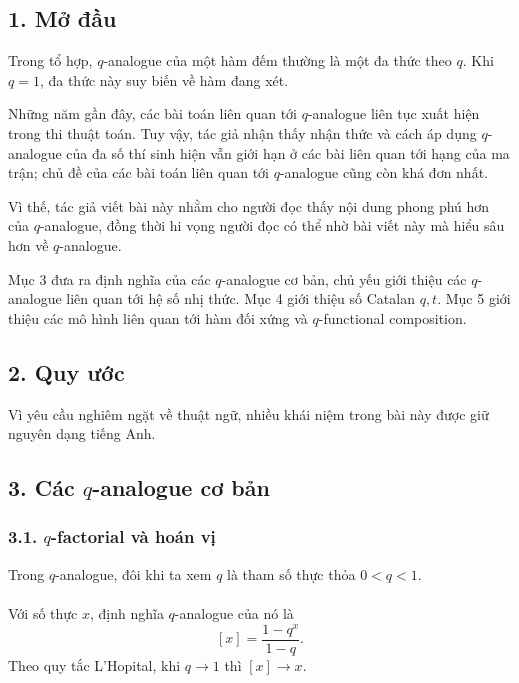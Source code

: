 \documentclass[11pt]{article}
\begin{document}
\subsection*{1. Mở đầu}

Trong tổ hợp, \(q\)-analogue của một hàm đếm thường là một đa thức theo \(q\).
Khi \(q=1\), đa thức này suy biến về hàm đang xét.

Những năm gần đây, các bài toán liên quan tới \(q\)-analogue liên tục xuất
hiện trong thi thuật toán. Tuy vậy, tác giả nhận thấy nhận thức và cách áp
dụng \(q\)-analogue của đa số thí sinh hiện vẫn giới hạn ở các bài liên quan
tới hạng của ma trận; chủ đề của các bài toán liên quan tới \(q\)-analogue
cũng còn khá đơn nhất.

Vì thế, tác giả viết bài này nhằm cho người đọc thấy nội dung phong phú hơn
của \(q\)-analogue, đồng thời hi vọng người đọc có thể nhờ bài viết này mà
hiểu sâu hơn về \(q\)-analogue.

Mục 3 đưa ra định nghĩa của các \(q\)-analogue cơ bản, chủ yếu giới thiệu các
\(q\)-analogue liên quan tới hệ số nhị thức. Mục 4 giới thiệu số Catalan
\(q,t\). Mục 5 giới thiệu các mô hình liên quan tới hàm đối xứng và
\(q\)-functional composition.

\subsection*{2. Quy ước}

Vì yêu cầu nghiêm ngặt về thuật ngữ, nhiều khái niệm trong bài này được giữ
nguyên dạng tiếng Anh.

\subsection*{3. Các \(q\)-analogue cơ bản}

\subsubsection*{3.1. \(q\)-factorial và hoán vị}

Trong \(q\)-analogue, đôi khi ta xem \(q\) là tham số thực thỏa \(0<q<1\).

\paragraph{}
Với số thực \(x\), định nghĩa \(q\)-analogue của nó là
\[
  [x]=\frac{1-q^x}{1-q}.
\]
Theo quy tắc L'Hopital, khi \(q\to1\) thì \([x]\to x\).
\end{document}
